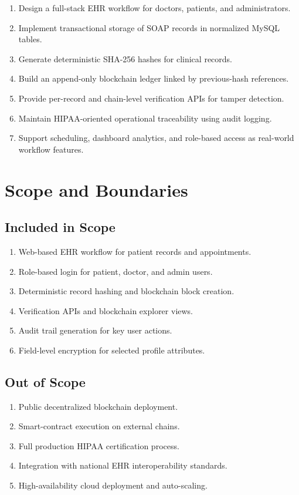 \documentclass[12pt,a4paper]{report}
\begin{document}
\begin{enumerate}
\item Design a full-stack EHR workflow for doctors, patients, and administrators.
\item Implement transactional storage of SOAP records in normalized MySQL tables.
\item Generate deterministic SHA-256 hashes for clinical records.
\item Build an append-only blockchain ledger linked by previous-hash references.
\item Provide per-record and chain-level verification APIs for tamper detection.
\item Maintain HIPAA-oriented operational traceability using audit logging.
\item Support scheduling, dashboard analytics, and role-based access as real-world workflow features.
\end{enumerate}

\section{Scope and Boundaries}

\subsection{Included in Scope}

\begin{enumerate}
\item Web-based EHR workflow for patient records and appointments.
\item Role-based login for patient, doctor, and admin users.
\item Deterministic record hashing and blockchain block creation.
\item Verification APIs and blockchain explorer views.
\item Audit trail generation for key user actions.
\item Field-level encryption for selected profile attributes.
\end{enumerate}

\subsection{Out of Scope}

\begin{enumerate}
\item Public decentralized blockchain deployment.
\item Smart-contract execution on external chains.
\item Full production HIPAA certification process.
\item Integration with national EHR interoperability standards.
\item High-availability cloud deployment and auto-scaling.
\end{enumerate}
\end{document}
